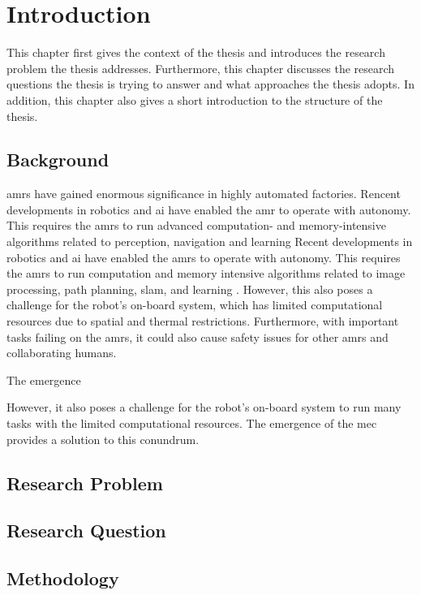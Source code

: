 \chapter{Introduction}

This chapter first gives the context of the thesis and introduces the research problem the thesis addresses. Furthermore, this chapter discusses the research questions the thesis is trying to answer and what approaches the thesis adopts. In addition, this chapter also gives a short introduction to the structure of the thesis.

\section{Background}

\glspl{amr} have gained enormous significance in highly automated factories. Rencent developments in robotics and \gls{ai} have enabled the \gls{amr} to operate with autonomy. This requires the \glspl{amr} to run advanced computation- and memory-intensive algorithms related to perception, navigation and learning \cite{Saeik2021, }
Recent developments in robotics and \gls{ai} have enabled the \glspl{amr} to operate with autonomy. This requires the \glspl{amr} to run computation and memory intensive algorithms related to image processing, path planning, \gls{slam}, and learning \cite{Saeik2021}. However, this also poses a challenge for the robot's on-board system, which has limited computational resources due to spatial and thermal restrictions. Furthermore, with important tasks failing on the \glspl{amr}, it could also cause safety issues for other \glspl{amr} and collaborating humans.

The emergence 

However, it also poses a challenge for the robot's on-board system to run many tasks with the limited computational resources. The emergence of the \gls{mec} provides a solution to this conundrum. 

\section{Research Problem}

\section{Research Question}

\section{Methodology}